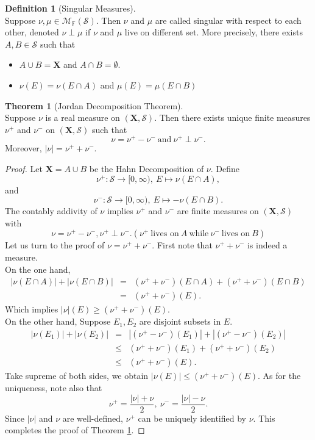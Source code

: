 \documentclass[12pt]{book}
\theoremstyle{definition}
\newtheorem{definition}{Definition}[chapter]
\newtheorem{theorem}{Theorem}[chapter]
\newcommand{\F}{\mathbb{F}}
\newcommand{\X}{\mathbf{X}}
\newcommand{\M}{\mathcal{M}}
\begin{document}
\begin{definition}[Singular Measures] \ \\
Suppose $\nu,\mu \in \M_\F(\mathcal S)$. Then $\nu$ and $\mu$ are called singular with    respect to each other, denoted $\nu \perp \mu$ if $\nu$ and $\mu$ live on different set. More precisely, there exists $A,B\in \mathcal S$ such that   
\begin{itemize}
	\item $A\cup B=\X$ and $A\cap B= \emptyset$.
	\item $\nu(E)=\nu(E\cap A)$ and $\mu(E)=\mu(E\cap B)$
\end{itemize}
\end{definition}


\begin{theorem}[Jordan Decomposition Theorem]\label{Joran_Decomposition} \ \\
Suppose $\nu$ is a real measure on $(\X,\mathcal S)$. Then there exists unique finite measures $\nu^+$ and $\nu^-$ on $(\X,\mathcal S)$ such that 
$$
\nu = \nu^+ - \nu^- \ \text{and} \ \nu^+ \perp \nu^-.
$$
Moreover, $|\nu|= \nu^+ + \nu^-$.
\end{theorem}
\begin{proof}
Let $\X=A\cup B$ be the Hahn Decomposition of $\nu$. Define
$$
\nu^+: \mathcal S \to [0,\infty),\ E \mapsto \nu(E\cap A),
$$
and 
$$
\nu^-: \mathcal S \to [0,\infty), \ E \mapsto -\nu(E\cap B).
$$
The contably addivity of $\nu$ implies $\nu^+$ and $\nu^-$ are finite measures on $(\X,\mathcal S)$ with 
$$
\nu = \nu^+ - \nu^-, \nu^+ \perp \nu^-. (\nu^+ \ \text{lives on}\  A \ \text{while} \ \nu^- \ \text{lives on}\  B)
$$
Let us turn to the proof of $\nu = \nu^+ + \nu^-$. First note that $\nu^+ + \nu^- $ is indeed a measure.\\
On the one hand, 
\begin{eqnarray*}
|\nu(E\cap A)| + |\nu(E\cap B)| &=& (\nu^+ + \nu^-)(E\cap A) + (\nu^+ + \nu^-)(E \cap B) \\
&=& (\nu^+ + \nu^-)(E).
\end{eqnarray*}
Which implies $|\nu|(E) \geq (\nu^+ +\nu^-)(E)$. \\
On the other hand, Suppose $E_1, E_2$ are disjoint subsets in $E$.
\begin{eqnarray*}
	|\nu(E_1)| + |\nu(E_2)| &=& |(\nu^+ - \nu^-)(E_1)| + |(\nu^+ - \nu^-)(E_2)| \\
	&\leq &  (\nu^+ + \nu^ -)(E_1) + (\nu^+ + \nu^ -)(E_2) \\
	&\leq & (\nu^+ + \nu^ -)(E).
\end{eqnarray*}
Take supreme of both sides, we obtain $|\nu(E)|\leq (\nu^+ + \nu^ -)(E)$.
As for the uniqueness, note also that
$$
\nu^+ = \frac{|\nu|+\nu}{2}, \ \nu^- = \frac{|\nu|-\nu}{2}.
$$
Since $|\nu|$ and $\nu$ are well-defined, $\nu^+$ can be uniquely identified by $\nu$.  This completes the proof of Theorem \ref{Joran_Decomposition}.
\end{proof}
\end{document}
